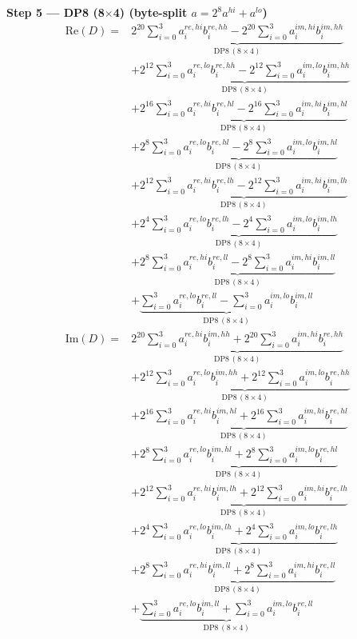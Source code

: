 \documentclass[fleqn]{article}
\newcommand{\DPop}[3]{\mathrm{DP#1}\,(#2\!\times\!#3)}
\begin{document}
\noindent\textbf{Step 5 --- DP8 (8$\times$4) \quad (byte-split $a = 2^{8} a^{hi} + a^{lo}$)}
\begin{align*}
\mathrm{Re}(D) = {}
  & \underbrace{2^{20}\sum_{i=0}^{3} a_i^{re,hi} b_i^{re,hh} - 2^{20}\sum_{i=0}^{3} a_i^{im,hi} b_i^{im,hh}}_{\DPop{8}{8}{4}} \\[0.3em]
  & + \underbrace{2^{12}\sum_{i=0}^{3} a_i^{re,lo} b_i^{re,hh} - 2^{12}\sum_{i=0}^{3} a_i^{im,lo} b_i^{im,hh}}_{\DPop{8}{8}{4}} \\[0.3em]
  & + \underbrace{2^{16}\sum_{i=0}^{3} a_i^{re,hi} b_i^{re,hl} - 2^{16}\sum_{i=0}^{3} a_i^{im,hi} b_i^{im,hl}}_{\DPop{8}{8}{4}} \\[0.3em]
  & + \underbrace{2^{8}\sum_{i=0}^{3} a_i^{re,lo} b_i^{re,hl} - 2^{8}\sum_{i=0}^{3} a_i^{im,lo} b_i^{im,hl}}_{\DPop{8}{8}{4}} \\[0.3em]
  & + \underbrace{2^{12}\sum_{i=0}^{3} a_i^{re,hi} b_i^{re,lh} - 2^{12}\sum_{i=0}^{3} a_i^{im,hi} b_i^{im,lh}}_{\DPop{8}{8}{4}} \\[0.3em]
  & + \underbrace{2^{4}\sum_{i=0}^{3} a_i^{re,lo} b_i^{re,lh} - 2^{4}\sum_{i=0}^{3} a_i^{im,lo} b_i^{im,lh}}_{\DPop{8}{8}{4}} \\[0.3em]
  & + \underbrace{2^{8}\sum_{i=0}^{3} a_i^{re,hi} b_i^{re,ll} - 2^{8}\sum_{i=0}^{3} a_i^{im,hi} b_i^{im,ll}}_{\DPop{8}{8}{4}} \\[0.3em]
  & + \underbrace{\sum_{i=0}^{3} a_i^{re,lo} b_i^{re,ll} - \sum_{i=0}^{3} a_i^{im,lo} b_i^{im,ll}}_{\DPop{8}{8}{4}}
\end{align*}
\begin{align*}
\mathrm{Im}(D) = {}
  & \underbrace{2^{20}\sum_{i=0}^{3} a_i^{re,hi} b_i^{im,hh} + 2^{20}\sum_{i=0}^{3} a_i^{im,hi} b_i^{re,hh}}_{\DPop{8}{8}{4}} \\[0.3em]
  & + \underbrace{2^{12}\sum_{i=0}^{3} a_i^{re,lo} b_i^{im,hh} + 2^{12}\sum_{i=0}^{3} a_i^{im,lo} b_i^{re,hh}}_{\DPop{8}{8}{4}} \\[0.3em]
  & + \underbrace{2^{16}\sum_{i=0}^{3} a_i^{re,hi} b_i^{im,hl} + 2^{16}\sum_{i=0}^{3} a_i^{im,hi} b_i^{re,hl}}_{\DPop{8}{8}{4}} \\[0.3em]
  & + \underbrace{2^{8}\sum_{i=0}^{3} a_i^{re,lo} b_i^{im,hl} + 2^{8}\sum_{i=0}^{3} a_i^{im,lo} b_i^{re,hl}}_{\DPop{8}{8}{4}} \\[0.3em]
  & + \underbrace{2^{12}\sum_{i=0}^{3} a_i^{re,hi} b_i^{im,lh} + 2^{12}\sum_{i=0}^{3} a_i^{im,hi} b_i^{re,lh}}_{\DPop{8}{8}{4}} \\[0.3em]
  & + \underbrace{2^{4}\sum_{i=0}^{3} a_i^{re,lo} b_i^{im,lh} + 2^{4}\sum_{i=0}^{3} a_i^{im,lo} b_i^{re,lh}}_{\DPop{8}{8}{4}} \\[0.3em]
  & + \underbrace{2^{8}\sum_{i=0}^{3} a_i^{re,hi} b_i^{im,ll} + 2^{8}\sum_{i=0}^{3} a_i^{im,hi} b_i^{re,ll}}_{\DPop{8}{8}{4}} \\[0.3em]
  & + \underbrace{\sum_{i=0}^{3} a_i^{re,lo} b_i^{im,ll} + \sum_{i=0}^{3} a_i^{im,lo} b_i^{re,ll}}_{\DPop{8}{8}{4}}
\end{align*}
\end{document}
